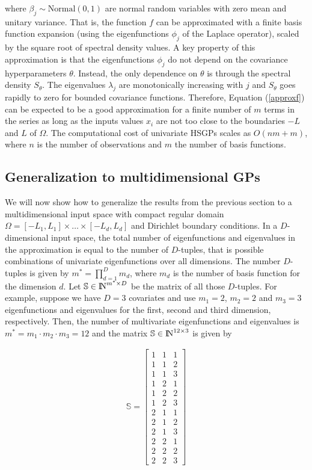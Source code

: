 \documentclass[]{interact}
\theoremstyle{plain}%
\theoremstyle{definition}
\theoremstyle{remark}
\begin{document}
\noindent where $\beta_j \sim \text{Normal}(0,1)$ are normal random variables with zero mean and unitary variance. That is, the function $f$ can be approximated with a finite basis function expansion (using the eigenfunctions $\phi_j$ of the Laplace operator), scaled by the square root of spectral density values. A key property of this approximation is that the eigenfunctions $\phi_j$ do not depend on the covariance hyperparameters $\theta$. Instead, the only dependence on $\theta$ is through the spectral density $S_{\theta}$. The eigenvalues $\lambda_j$ are monotonically increasing with $j$ and $S_{\theta}$ goes rapidly to zero for bounded covariance functions. Therefore, Equation (\ref{approxf}) can be expected to be a good approximation for a finite number of $m$ terms in the series as long as the inputs values $x_i$ are not too close to the boundaries $-L$ and $L$ of $\Omega$. The computational cost of univariate HSGPs scales as $O(nm + m)$, where $n$ is the number of observations and $m$ the number of basis functions.

\subsection{Generalization to multidimensional GPs}

We will now show how to generalize the results from the previous section to a multidimensional input space with compact regular domain $\Omega=[-L_1,L_1] \times \dots \times [-L_d,L_d]$ and Dirichlet boundary conditions. 
In a $D$-dimensional input space, the total number of eigenfunctions and eigenvalues in the approximation is equal to the number of $D$-tuples, that is possible combinations of univariate eigenfunctions over all dimensions. The number $D$-tuples is given by $m^{\ast} = \prod_{d=1}^{D} m_d$, where $m_d$ is the number of basis function for the dimension $d$. Let $\mathbb{S}\in {\rm I\!N}^{m^{\ast} \times D}$ be the matrix of all those $D$-tuples. For example, suppose we have $D=3$ covariates and use $m_{1}=2$, $m_{2}=2$ and $m_{3}=3$ eigenfunctions and eigenvalues for the first, second and third dimension, respectively. Then, the number of multivariate eigenfunctions and eigenvalues is $m^{\ast} = m_{1} \cdot m_{2} \cdot m_{3} = 12$ and the matrix $\mathbb{S}\in {\rm I\!N}^{12 \times 3}$ is given by

\begin{eqnarray}
\mathbb{S}=
\left[ {\begin{array}{ccc}
1 & 1 & 1 \nonumber \\
1 & 1 & 2 \\
1 & 1 & 3 \\
1 & 2 & 1 \\
1 & 2 & 2 \\
1 & 2 & 3 \\
2 & 1 & 1 \\
2 & 1 & 2 \\
2 & 1 & 3 \\
2 & 2 & 1 \\
2 & 2 & 2 \\
2 & 2 & 3 
\end{array} } \right]
\end{eqnarray} 
\end{document}
